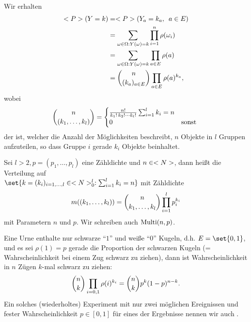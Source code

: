 
Wir erhalten
\begin{align*}
	<P>(Y = k) &= <P>(Y_a = k_a, \enskip a \in E)\notag\\
	&= \sum_{\omega \in \Omega: Y(\omega) = k} \prod_{i=1}^{n} \rho(\omega_i)\notag\\
	&= \sum_{\omega \in \Omega: Y(\omega) = k} \prod_{a \in E} \rho(a)\\ 
	&= \binom{n}{(k_a)_{a\in E}} 
	\prod_{a \in E} \rho(a)^{k_a},
	\end{align*}
	wobei
	\begin{align*}
	\binom{n}{(k_1, \dots, k_l)} = 
	\begin{cases}
	\frac{n!}{k_1 ! \, k_2 ! \cdots k_l !} \sum_{i=1}^{l} k_i = n & \\
	0 & \text{sonst }
	\end{cases}
\end{align*}
der  ist, welcher die Anzahl der Möglichkeiten beschreibt, $n$ Objekte in $l$ Gruppen aufzuteilen, so dass Gruppe $i$ gerade $k_i$ Objekte beinhaltet.
\begin{definition}
	Sei $l > 2, p = (p_1, \dots, p_l)$ eine Zähldichte und $n \in <N>$, dann heißt die Verteilung auf \\
	$\set{k = (k_i)_{i=1,\dots,l} \in \N_{0}^{l} : \sum_{i=1}^{l} k_i = n}$ mit Zähldichte
	\begin{align}
		m((k_1,\dots,k_l)) = \binom{n}{k_1, \dots, k_l}\prod_{i=1}^{l} p_i^{k_i}\notag
	\end{align}
	 mit Parametern $n$ und $p$. Wir schreiben auch $\operatorname{Multi}(n,p)$.
\end{definition}
\begin{example}
	Eine Urne enthalte nur schwarze ``$1$'' und weiße ``$0$'' Kugeln, d.h. $E=\set{0,1}$, und es sei $\rho(1) = p$ gerade die Proportion der schwarzen Kugeln (= Wahrscheinlichkeit bei einem Zug schwarz zu ziehen), dann ist Wahrscheinlichkeit in $n$ Zügen $k$-mal schwarz zu ziehen:
	\begin{align}
		\binom{n}{k}\prod_{i=0,1} \rho(i)^{k_i} = \binom{n}{k} p^k (1-p)^{n-k}.\notag
	\end{align}
	Ein solches (wiederholtes) Experiment mit nur zwei möglichen Ereignissen und fester Wahrscheinlichkeit $p \in [0,1]$ für eines der Ergebnisse nennen wir auch .
\end{example}

